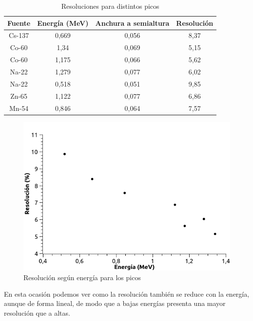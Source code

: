 \documentclass[a4paper,12pt,spanish]{article}
\begin{document}
	
	
	
	
	\begin{table}[H]
		\centering
		\begin{tabular}{|c|c|c|c|}
			\hline
			Fuente & Energía (MeV) & Anchura a semialtura & Resolución \\ \hline\hline
			Cs-137 & 0,669         & 0,056      & 8,37       \\ \hline
			Co-60  & 1,34          & 0,069      & 5,15       \\ \hline
			Co-60  & 1,175         & 0,066      & 5,62       \\ \hline
			Na-22  & 1,279         & 0,077      & 6,02       \\ \hline
			Na-22  & 0,518         & 0,051      & 9,85       \\ \hline
			Zn-65  & 1,122         & 0,077      & 6,86       \\ \hline
			Mn-54  & 0,846         & 0,064      & 7,57       \\ \hline
		\end{tabular}
	\caption{Resoluciones para distintos picos}
	\end{table}
	
	
\begin{figure}[H]
	\centering
	\includegraphics[width=0.7\linewidth]{6_2_resolucionenergia}
	\caption{Resolución según energía para los picos}
	\label{fig:62resolucionenergia}
\end{figure}


En esta ocasión podemos ver como la resolución también se reduce con la energía, aunque de forma lineal, de modo que a bajas energías presenta una mayor resolución que a altas.
\end{document}
